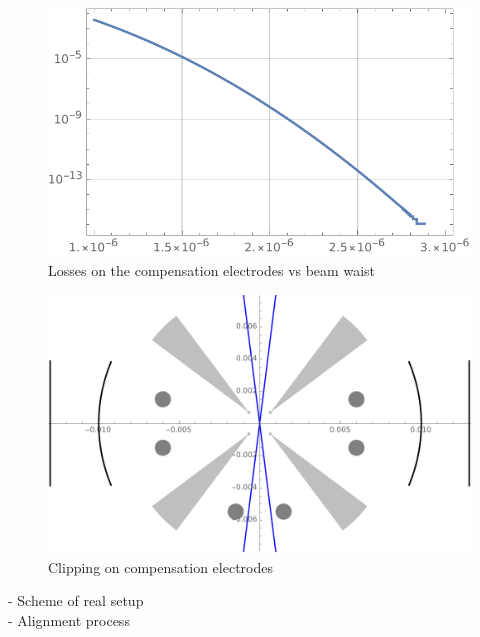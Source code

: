 \begin{figure}[H]
\centering
\includegraphics[width=\textwidth]{img/Plosses}
\caption{Losses on the compensation electrodes vs beam waist}
\end{figure}
\begin{figure}[H]
\centering
\includegraphics[width=\textwidth]{img/clipping}
\caption{Clipping on compensation electrodes}
\end{figure}

- Scheme of real setup \\
- Alignment process
